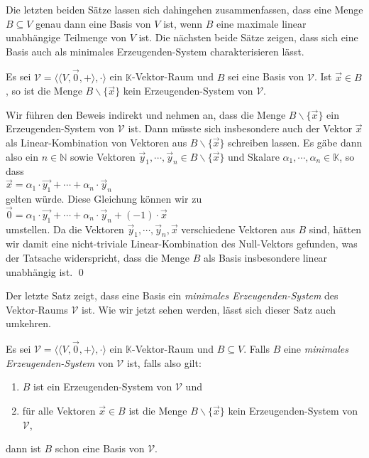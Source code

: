 Die letzten beiden S\"{a}tze lassen sich dahingehen zusammenfassen, dass eine Menge
$B \subseteq V$ genau dann eine Basis von $V$ ist, wenn $B$ eine maximale linear unabh\"{a}ngige
Teilmenge von $V$ ist.  Die n\"{a}chsten beide S\"{a}tze zeigen, dass sich eine Basis auch als minimales
Erzeugenden-System charakterisieren l\"{a}sst.

\begin{Satz}
  Es sei $\mathcal{V} = \bigl\langle \langle V, \vec{0}, + \rangle, \cdot \bigr\rangle$ ein
  $\mathbb{K}$-Vektor-Raum und $B$ sei eine Basis von $\mathcal{V}$.  Ist $\vec{x} \in B$,
  so ist die Menge $B \backslash \{ \vec{x} \}$ kein Erzeugenden-System von $\mathcal{V}$.
\end{Satz}

\proof
Wir f\"{u}hren den Beweis indirekt und nehmen an, dass die Menge $B \backslash \{ \vec{x} \}$ ein 
Erzeugenden-System von $\mathcal{V}$ ist.  Dann m\"{u}sste sich insbesondere auch der Vektor $\vec{x}$ als
Linear-Kombination von Vektoren aus  $B \backslash \{ \vec{x} \}$ schreiben lassen.  Es g\"{a}be dann
also ein $n \in \mathbb{N}$ sowie Vektoren  $\vec{y}_1, \cdots, \vec{y}_n \in B\backslash \{\vec{x}\}$ und Skalare 
$\alpha_1, \cdots, \alpha_n \in \mathbb{K}$, so dass
\\[0.2cm]
\hspace*{1.3cm}
$\vec{x} = \alpha_1 \cdot \vec{y_1} + \cdots + \alpha_n \cdot \vec{y}_n$
\\[0.2cm]
gelten w\"{u}rde.  Diese Gleichung k\"{o}nnen wir zu
\\[0.2cm]
\hspace*{1.3cm}
$\vec{0} =  \alpha_1 \cdot \vec{y_1} + \cdots + \alpha_n \cdot \vec{y}_n + (-1) \cdot \vec{x}$
\\[0.2cm]
umstellen.  Da die Vektoren $\vec{y}_1, \cdots, \vec{y}_n, \vec{x}$ verschiedene Vektoren aus $B$ sind,
h\"{a}tten wir damit eine nicht-triviale Linear-Kombination des Null-Vektors gefunden, was der Tatsache
widerspricht, dass die Menge $B$ als Basis insbesondere linear unabh\"{a}ngig ist. \qed

Der letzte Satz zeigt, dass eine Basis ein \emph{\color{blue}minimales Erzeugenden-System} des Vektor-Raums $\mathcal{V}$
ist.  Wie wir jetzt sehen werden, l\"{a}sst sich dieser Satz auch umkehren.

\begin{Satz}
  Es sei $\mathcal{V} = \bigl\langle \langle V, \vec{0}, + \rangle, \cdot \bigr\rangle$ ein $\mathbb{K}$-Vektor-Raum 
  und $B \subseteq V$.  Falls $B$ eine \emph{\color{blue}minimales Erzeugenden-System}
  von $\mathcal{V}$ ist, falls also gilt:
  \begin{enumerate}
  \item $B$ ist ein Erzeugenden-System von $\mathcal{V}$ und
  \item f\"{u}r alle Vektoren $\vec{x} \in B$ ist die Menge $B \backslash \{ \vec{x} \}$
        kein Erzeugenden-System von $\mathcal{V}$,
  \end{enumerate}
  dann ist $B$ schon eine Basis von $\mathcal{V}$.
\end{Satz}


